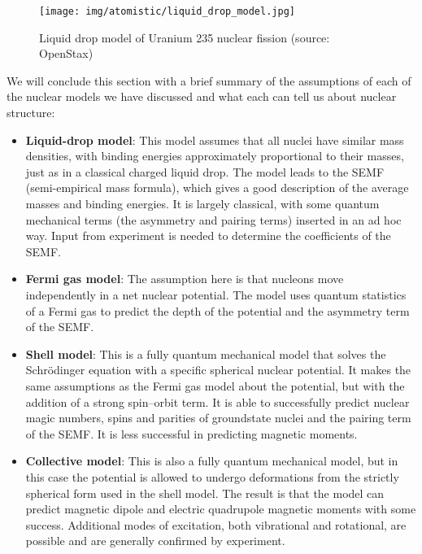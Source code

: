 	\begin{figure}[H]
		\centering
		\texttt{[image: img/atomistic/liquid\_drop\_model.jpg]}
		\caption[Liquid drop model of Uranium 235 nuclear fission]{Liquid drop model of Uranium 235 nuclear fission (source: OpenStax)}
	\end{figure}
	We will conclude this section with a brief summary of the assumptions of each of the nuclear models we have
discussed and what each can tell us about nuclear structure:
	\begin{itemize}
		\item \textbf{Liquid-drop model}: This model assumes that all nuclei have similar mass densities, with binding energies approximately proportional to their masses, just as in a classical charged liquid drop. The model leads to the SEMF (semi-empirical mass formula), which gives a good description of the average masses and binding energies. It is largely classical, with some quantum mechanical terms (the asymmetry and pairing terms) inserted in an ad hoc way. Input from experiment is needed to determine the coefficients of the SEMF.
	
		\item \textbf{Fermi gas model}: The assumption here is that nucleons move independently in a net nuclear 	potential. The model uses quantum statistics of a Fermi gas to predict the depth of the potential and the asymmetry term of the SEMF.
	
		\item \textbf{Shell model}: This is a fully quantum mechanical model that solves the Schrödinger equation with a specific spherical nuclear potential. It makes the same assumptions as the Fermi gas model about the potential, but with the addition of a strong spin–orbit term. It is able to successfully predict nuclear magic numbers, spins and parities of groundstate nuclei and the pairing term of the SEMF. It is less successful in predicting magnetic moments.
	
		\item \textbf{Collective model}: This is also a fully quantum mechanical model, but in this case the potential is allowed to undergo deformations from the strictly spherical form used in the shell model. The result is that the model can predict magnetic dipole and electric quadrupole magnetic moments with some success. Additional modes of excitation, both vibrational and rotational, are possible and are generally confirmed by experiment.
	\end{itemize}
	
